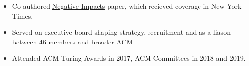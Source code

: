\documentclass[10pt,a4paper,ragged2e,withhyper]{altacv}
\begin{document}
\begin{paracol}{2}

\begin{itemize}
\item Co-authored \href{https://acm-fca.org/2018/03/29/negativeimpacts/}{Negative Impacts} paper, which recieved coverage in New York Times.
    \item Served on executive board shaping strategy, recruitment and as a liason between 46 members and broader ACM.
    \item Attended ACM Turing Awards in 2017, ACM Committees in 2018 and 2019.
\end{itemize}

\divider

\end{paracol}
\end{document}
